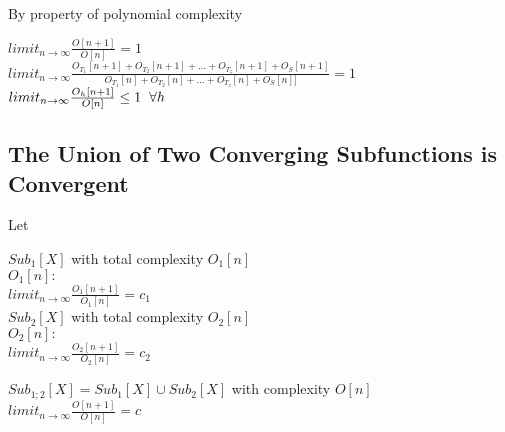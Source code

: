 \documentclass[11pt]{article}
\begin{document}
\vspace{6mm}
By property of polynomial complexity
\begin{center}
\vspace{1mm}
$
limit_{n \rightarrow \infty} \frac{O[n+1]}{O[n]} = 1
$
\\ \vspace{2mm}
$
limit_{n \rightarrow \infty} \frac{O_{T_1}[n+1] + O_{T_2}[n+1] + ... + O_{T_z}[n+1] + O_S[n+1]}{O_{T_1}[n] + O_{T_2}[n] + ... + O_{T_z}[n] + O_S[n]]} = 1
$
\\ \vspace{2mm}
$
limit_{n \rightarrow \infty} \frac{O_h[n+1]}{O[n]} \leq 1 \hspace{2mm} \forall h
$
\end{center}



\subsection{The Union of Two Converging Subfunctions is Convergent}
Let
\begin{center}
$
Sub_1[X]$ with total complexity $O_1[n]$
\\ \vspace{2mm}
$
O_1[n]:
$
\\ \vspace{2mm}
$
limit_{n \rightarrow \infty}\frac{O_1[n+1]}{O_1[n]} = c_1
$
\\ \vspace{6mm}
$
Sub_2[X]$ with total complexity $O_2[n]$
\\ \vspace{2mm}
$
O_2[n]:
$
\\ \vspace{2mm}
$
limit_{n \rightarrow \infty}\frac{O_2[n+1]}{O_2[n]} = c_2
$
\end{center}
\vspace{1mm}
\begin{center}
$
Sub_{1;2}[X] = Sub_1[X] \cup Sub_2[X]$ with complexity $O[n]
$
\\ \vspace{2mm}
$
limit_{n \rightarrow \infty}\frac{O[n+1]}{O[n]} = c
$
\end{center}
\end{document}
